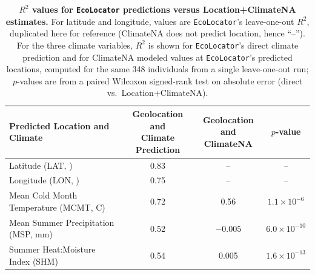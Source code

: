 \documentclass[]{article}
\newcommand{\ecolocator}{\texttt{EcoLocator}\xspace}
\begin{document}
\begin{table}[ht]
  \centering
  \caption{\textbf{$R^2$ values for \ecolocator predictions versus Location+ClimateNA estimates.}
  For latitude and longitude, values are \ecolocator's leave-one-out $R^2$, duplicated here for
  reference (ClimateNA does not predict location, hence ``--''). For the three climate variables,
  $R^2$ is shown for \ecolocator's direct climate prediction and for ClimateNA modeled values at
  \ecolocator's predicted locations, computed for the same 348 individuals from a single leave-one-out
  run; $p$-values are from a paired Wilcoxon signed-rank test on absolute error (direct vs.\
  Location+ClimateNA).}
  \label{tab:supptable1}
  \begin{tabular}{@{}p{6cm}ccc@{}}
  \hline
  \textbf{Predicted Location and Climate} & \shortstack{\textbf{Geolocation and}\\ \textbf{Climate Prediction}} & \shortstack{\textbf{Geolocation}\\ \textbf{and ClimateNA}} & \textbf{$p$-value} \\
  \hline
  Latitude (LAT, \textdegree) & 0.83 & -- & -- \\
  Longitude (LON, \textdegree) & 0.75 & -- & -- \\
  Mean Cold Month Temperature (MCMT, \textdegree C) & 0.72 & 0.56 & $1.1\times10^{-6}$ \\
  Mean Summer Precipitation (MSP, mm) & 0.52 & $-0.005$ & $6.0\times10^{-10}$ \\
  Summer Heat:Moisture Index (SHM) & 0.54 & 0.005 & $1.6\times10^{-13}$ \\
  \hline
  \end{tabular}
\end{table}
\end{document}
